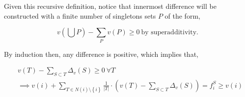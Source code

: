 \documentclass[american]{scrartcl}
\newcommand{\set}[1]{\left\{#1\right\}}
\newcommand{\abs}[1]{\left\lvert #1 \right\rvert}
\begin{document}
Given this recursive definition, notice that innermost difference will be constructed with a finite number of singletons sets $P$ of the form,

\begin{equation}
    v\left(\bigcup P\right) - \sum_{P} v(P) \geq 0 \ \text{by superadditivity}.
\end{equation}


By induction then, any difference is positive, which implies that,

\begin{equation}
    \begin{split}
        &v(T) - \sum_{S \subset T} \Delta_v(S) \geq 0 \ \forall T \\
        &\implies v(i) + \sum_{T \in N(i) \setminus \set{i} } \frac{1}{\abs{T}} \cdot \left( v(T) - \sum_{S \subset T} \Delta_v(S) \right) = f_i^S \geq v(i)
    \end{split}
\end{equation}
\end{document}
